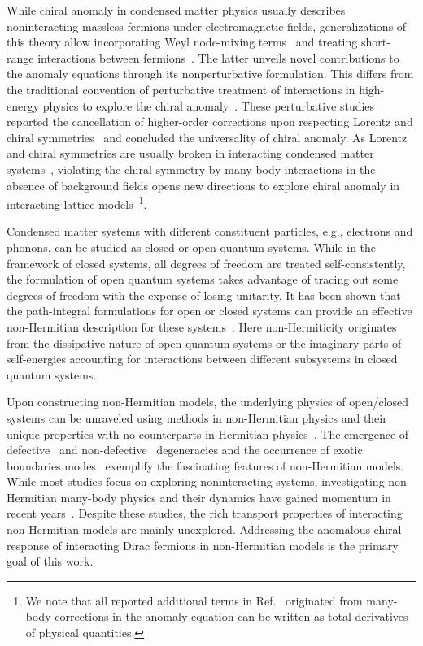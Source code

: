 \documentclass[prl,aps,showpacs,twocolumn,preprintnumbers,
amsmath,amssymb,superscriptaddress,longbibliography]{revtex4-1}
\begin{document}
While chiral anomaly in condensed matter physics usually describes noninteracting massless fermions under electromagnetic fields, generalizations of this theory allow incorporating Weyl node-mixing terms~\cite{Raines2017} and treating short-range interactions between fermions~\cite{Kikuchi1992, Rylands2021, Parhizkar2023}. The latter unveils novel contributions to the anomaly equations through its nonperturbative formulation. This differs from the traditional convention of perturbative treatment of interactions in high-energy physics to explore the chiral anomaly~\cite{Adler1969b}. These perturbative studies reported the cancellation of higher-order corrections upon respecting Lorentz and chiral symmetries~\cite{Giuliani2021} and concluded the universality of chiral anomaly. As Lorentz and chiral symmetries are usually broken in interacting condensed matter systems~\cite{Raines2017, Giuliani2021, Rylands2021}, violating the chiral symmetry by many-body interactions in the absence of background fields opens new directions to explore chiral anomaly in interacting lattice models~\footnote{We note that all reported additional terms in Ref.~\cite{Kikuchi1992, Rylands2021, Parhizkar2023} originated from many-body corrections in the anomaly equation can be written as total derivatives of physical quantities.}.


Condensed matter systems with different constituent particles, e.g., electrons and phonons, can be studied as closed or open quantum systems. While in the framework of closed systems, all degrees of freedom are treated self-consistently, the formulation of open quantum systems takes advantage of tracing out some degrees of freedom with the expense of losing unitarity. It has been shown that the path-integral formulations for open or closed systems can provide an effective non-Hermitian description for these systems~\cite{Kamenev2005, Vanleeuwen2005, Sieberer2016, Michishita2020, Zirnstein2021, GomezLeon2022, Gal2023}. Here non-Hermiticity originates from the dissipative nature of open quantum systems or the imaginary parts of self-energies accounting for interactions between different subsystems in closed quantum systems.

Upon constructing non-Hermitian models, the underlying physics of open/closed systems can be unraveled using methods in non-Hermitian physics and their unique properties with no counterparts in Hermitian physics~\cite{Zyuzin2019, Ashida2020,  Wang2021, Bergholtz2021, Okuma2023}.
The emergence of defective~\cite{Sayyad2021, Ding2022, Sayyad2022ep} and non-defective~\cite{Zhang2021b, Sayyad2022pro, Sayyad2022b} degeneracies and the occurrence of exotic boundaries modes~\cite{Zhang2022} exemplify the fascinating features of non-Hermitian models. While most studies focus on exploring noninteracting systems, investigating non-Hermitian many-body physics and their dynamics have gained momentum in recent years~\cite{Fukui1998, Buca2020, Zhang2021, Nakagawa2021, Hyart2022, Yoshida2023, Sayyad2023, Mak2023}. Despite these studies, the rich transport properties of interacting non-Hermitian models are mainly unexplored. Addressing the anomalous chiral response of interacting Dirac fermions in non-Hermitian models is the primary goal of this work.
\end{document}
